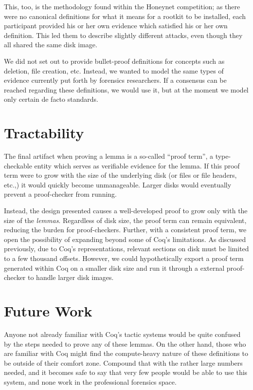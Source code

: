 \documentclass[nocopyrightspace]{sigplanconf}
\begin{document}
This, too, is the methodology found within the Honeynet competition; as there
were no canonical definitions for what it means for a rootkit to be installed,
each participant provided his or her own evidence which satisfied his or her
own definition. This led them to describe slightly different attacks, even
though they all shared the same disk image.

We did not set out to provide bullet-proof definitions for concepts such as
deletion, file creation, etc. Instead, we wanted to model the same types of
evidence currently put forth by forensics researchers. If a consensus can be
reached regarding these definitions, we would use it, but at the moment we
model only certain de facto standards.

\section{Tractability}
The final artifact when proving a lemma is a so-called ``proof term'', a
type-checkable entity which serves as verifiable evidence for the lemma. If
this proof term were to grow with the size of the underlying disk (or files or
file headers, etc.,) it would quickly become unmanageable. Larger disks would
eventually prevent a proof-checker from running.

Instead, the design presented causes a well-developed proof to grow only with
the size of the {\em lemmas}. Regardless of disk size, the proof term can
remain equivalent, reducing the burden for proof-checkers. Further, with a
consistent proof term, we open the possibility of expanding beyond some of
Coq's limitations. As discussed previously, due to Coq's representations,
relevant sections on disk must be limited to a few thousand offsets. However,
we could hypothetically export a proof term generated within Coq on a smaller
disk size and run it through a external proof-checker to handle larger disk
images.

\section{Future Work}
Anyone not already familiar with Coq's tactic systems would be quite confused
by the steps needed to prove any of these lemmas. On the other hand, those who
are familiar with Coq might find the compute-heavy nature of these definitions
to be outside of their comfort zone. Compound that with the rather large
numbers needed, and it becomes safe to say that very few people would be able
to use this system, and none work in the professional forensics space.
\end{document}
